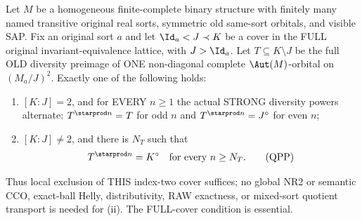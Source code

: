 \begin{lemma}
\label{lem:typed-quotient-full-cover-powers}
Let $M$ be a homogeneous finite-complete binary structure
with finitely many named transitive original real sorts,
symmetric old same-sort orbitals, and visible SAP.
Fix an original sort $a$ and let
$\Id_a<J\prec K$ be a cover in the FULL original
invariant-equivalence lattice, with $J>\Id_a$.
Let $T\subseteq K\setminus J$ be the full OLD diversity
preimage of ONE non-diagonal complete $\Aut(M)$-orbital
on $(M_a/J)^2$. Exactly one of the following holds:
\begin{enumerate}[label=(\roman*)]
\item $[K:J]=2$, and for EVERY $n\ge1$ the actual
STRONG diversity powers alternate:
$T^{\starprod n}=T$ for odd $n$ and
$T^{\starprod n}=J^\circ$ for even $n$;
\item $[K:J]\ne2$, and there is $N_T$ such that
\[
                   T^{\starprod n}=K^\circ
                   \quad\text{for every }n\ge N_T.
\tag{QPP}\label{eq:typed-quotient-full-cover-powers}
\]
\end{enumerate}
Thus local exclusion of THIS index-two cover suffices;
no global NR2 or semantic CCO, exact-ball Helly,
distributivity, RAW exactness, or mixed-sort
quotient transport is needed for (ii).
The FULL-cover condition is essential.
\end{lemma}
